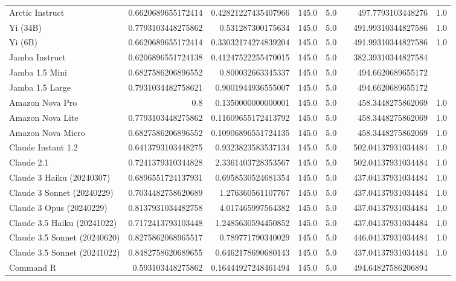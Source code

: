 \begin{table}[htp]
{\begin{tabular}{lrrrrrrr}
Arctic Instruct & 0.6620689655172414 & 0.42821227435407966 & 145.0 & 5.0 &  & 497.7793103448276 & 1.0 \\
Yi (34B) & 0.7793103448275862 & 0.531287300175634 & 145.0 & 5.0 &  & 491.99310344827586 & 1.0 \\
Yi (6B) & 0.6620689655172414 & 0.33032174274839204 & 145.0 & 5.0 &  & 491.99310344827586 & 1.0 \\
Jamba Instruct & 0.6206896551724138 & 0.41247522255470015 & 145.0 & 5.0 &  & 382.39310344827584 &  \\
Jamba 1.5 Mini & 0.6827586206896552 & 0.800032663345337 & 145.0 & 5.0 &  & 494.6620689655172 &  \\
Jamba 1.5 Large & 0.7931034482758621 & 0.9001944936555007 & 145.0 & 5.0 &  & 494.6620689655172 &  \\
Amazon Nova Pro & 0.8 & 0.1350000000000001 & 145.0 & 5.0 &  & 458.3448275862069 & 1.0 \\
Amazon Nova Lite & 0.7793103448275862 & 0.11609655172413792 & 145.0 & 5.0 &  & 458.3448275862069 & 1.0 \\
Amazon Nova Micro & 0.6827586206896552 & 0.10906896551724135 & 145.0 & 5.0 &  & 458.3448275862069 & 1.0 \\
Claude Instant 1.2 & 0.6413793103448275 & 0.9323823583537134 & 145.0 & 5.0 &  & 502.04137931034484 & 1.0 \\
Claude 2.1 & 0.7241379310344828 & 2.3361403728353567 & 145.0 & 5.0 &  & 502.04137931034484 & 1.0 \\
Claude 3 Haiku (20240307) & 0.6896551724137931 & 0.6958530524681354 & 145.0 & 5.0 &  & 437.04137931034484 & 1.0 \\
Claude 3 Sonnet (20240229) & 0.7034482758620689 & 1.276360561107767 & 145.0 & 5.0 &  & 437.04137931034484 & 1.0 \\
Claude 3 Opus (20240229) & 0.8137931034482758 & 4.017465997564382 & 145.0 & 5.0 &  & 437.04137931034484 & 1.0 \\
Claude 3.5 Haiku (20241022) & 0.7172413793103448 & 1.2485630594450852 & 145.0 & 5.0 &  & 437.04137931034484 & 1.0 \\
Claude 3.5 Sonnet (20240620) & 0.8275862068965517 & 0.789771790340029 & 145.0 & 5.0 &  & 446.04137931034484 & 1.0 \\
Claude 3.5 Sonnet (20241022) & 0.8482758620689655 & 0.6462178690680143 & 145.0 & 5.0 &  & 437.04137931034484 & 1.0 \\
Command R & 0.593103448275862 & 0.16444927248461494 & 145.0 & 5.0 &  & 494.64827586206894 &  \\

\end{tabular}}
\end{table}
